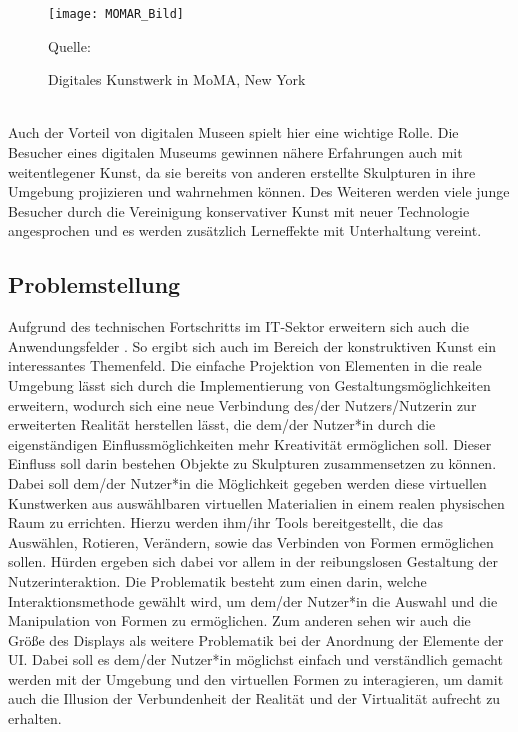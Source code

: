 \documentclass[12pt,a4paper, oneside]{scrartcl}
\newcommand*{\quelle}[1]{\par\footnotesize Quelle:~#1}
\begin{document}
\begin{figure}[h!]
\centering
\texttt{[image: MOMAR\_Bild]}
\quelle{\cite{ehrenkranz_2018}}
\caption{Digitales Kunstwerk in MoMA, New York}
\label{figure_MoMAR}
\end{figure} \\
Auch der Vorteil von digitalen Museen spielt hier eine wichtige Rolle. Die Besucher eines digitalen Museums gewinnen nähere Erfahrungen auch mit weitentlegener Kunst, da sie bereits von anderen erstellte Skulpturen in ihre Umgebung projizieren und wahrnehmen können. Des Weiteren werden viele junge Besucher durch die Vereinigung konservativer Kunst mit neuer Technologie angesprochen und es werden zusätzlich Lerneffekte mit Unterhaltung vereint.



	
\newpage

	
	
\subsection{Problemstellung}

Aufgrund des technischen Fortschritts im IT-Sektor erweitern sich auch die Anwendungsfelder \cite{gal_digital_gmbh_2019}. So ergibt sich auch im Bereich der konstruktiven Kunst ein interessantes Themenfeld.
Die einfache Projektion von Elementen in die reale Umgebung lässt sich durch die Implementierung von Gestaltungsmöglichkeiten erweitern, wodurch sich eine neue Verbindung des/der Nutzers/Nutzerin zur erweiterten Realität herstellen lässt, die dem/der Nutzer*in durch die eigenständigen Einflussmöglichkeiten mehr Kreativität ermöglichen soll. Dieser Einfluss soll darin bestehen Objekte zu Skulpturen zusammensetzen zu können. Dabei soll dem/der Nutzer*in die Möglichkeit gegeben werden diese virtuellen Kunstwerken aus auswählbaren virtuellen Materialien in einem realen physischen Raum zu errichten. Hierzu werden ihm/ihr Tools bereitgestellt, die das Auswählen, Rotieren, Verändern, sowie das Verbinden von Formen ermöglichen sollen. Hürden ergeben sich dabei vor allem in der reibungslosen Gestaltung der Nutzerinteraktion. Die Problematik besteht zum einen darin, welche Interaktionsmethode gewählt wird, um dem/der Nutzer*in die Auswahl und die Manipulation von Formen zu ermöglichen. Zum anderen sehen wir auch die Größe des Displays als weitere Problematik bei der Anordnung der Elemente der UI.
Dabei soll es dem/der Nutzer*in möglichst einfach und verständlich gemacht werden mit der Umgebung und den virtuellen Formen zu interagieren, um damit auch die Illusion der Verbundenheit der Realität und der Virtualität aufrecht zu erhalten.
\end{document}
